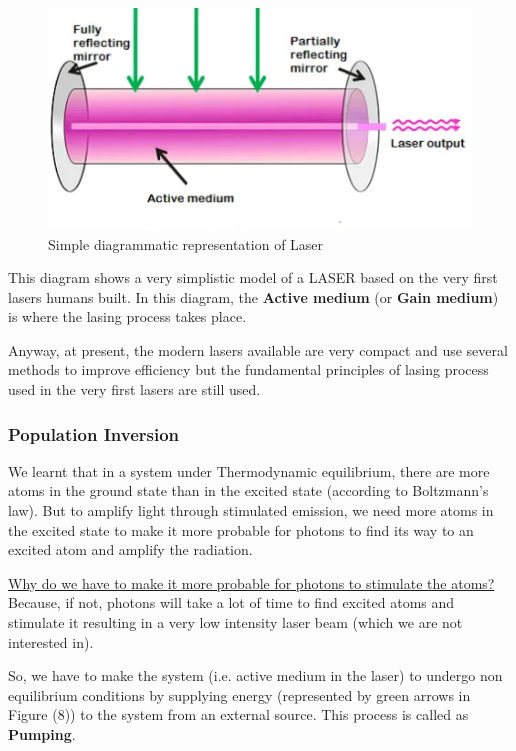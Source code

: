\documentclass[12pt]{article}
\begin{document}
\begin{figure}[H]
    \centering
    \includegraphics[scale=.9]{./img/09_active_medium.png}
    \caption{Simple diagrammatic representation of Laser}
\end{figure}

This diagram shows a very simplistic model of a LASER based on the very first lasers humans built. In this diagram, the \textbf{Active medium} (or \textbf{Gain medium}) is where the lasing process takes place. \vspace{.2cm}

Anyway, at present, the modern lasers available are very compact and use several methods to improve efficiency but the fundamental principles of lasing process used in the very first lasers are still used.

\subsubsection{Population Inversion}

We learnt that in a system under Thermodynamic equilibrium, there are more atoms in the ground state than in the excited state (according to Boltzmann's law). But to amplify light through stimulated emission, we need more atoms in the excited state to make it more probable for photons to find its way to an excited atom and amplify the radiation. \vspace{.2cm}

\uline{Why do we have to make it more probable for photons to stimulate the atoms?} Because, if not, photons will take a lot of time to find excited atoms and stimulate it resulting in a very low intensity laser beam (which we are not interested in). \vspace{.2cm}

So, we have to make the system (i.e. active medium in the laser) to undergo non equilibrium conditions by supplying energy (represented by green arrows in Figure (8)) to the system from an external source. This process is called as \textbf{Pumping}. \vspace{.2cm}
\end{document}
